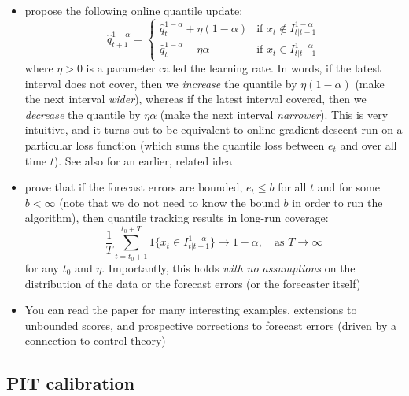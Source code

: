 \documentclass{article}
\begin{document}
\begin{itemize}
\item \citet{angelopoulos2023conformal} propose the following online quantile 
  update: 
  \[
  \hat{q}^{1-\alpha}_{t+1} =
  \begin{cases}
  \hat{q}^{1-\alpha}_t + \eta (1-\alpha) & \text{if $x_t \notin
    I^{1-\alpha}_{t|t-1}$} \\
  \hat{q}^{1-\alpha}_t - \eta \alpha & \text{if $x_t \in I^{1-\alpha}_{t|t-1}$}  
  \end{cases}
  \]
  where $\eta > 0$ is a parameter called the learning rate. In words, if the
  latest interval does not cover, then we \emph{increase} the quantile by 
  $\eta(1-\alpha)$ (make the next interval \emph{wider}), whereas if the latest 
  interval covered, then we \emph{decrease} the quantile by $\eta\alpha$ (make
  the next interval \emph{narrower}). This is very intuitive, and it turns out
  to be equivalent to online gradient descent run on a particular loss function 
  (which sums the quantile loss between $e_t$ and 
  over all time $t$). See also \citet{gibbs2021adaptive} for an earlier, related
  idea 

\item \citet{angelopoulos2023conformal} prove that if the forecast errors are
  bounded, $e_t \leq b$ for all $t$ and for some $b < \infty$ (note that we do
  not need to know the bound $b$ in order to run the algorithm), then quantile 
  tracking results in long-run coverage: 
  \[
  \frac{1}{T} \sum_{t=t_0+1}^{t_0+T} 1 \big\{ x_t \in I^{1-\alpha}_{t|t-1}
  \big\} \to 1-\alpha, \quad \text{as $T \to \infty$} 
  \]
  for any $t_0$ and $\eta$. Importantly, this holds \emph{with no assumptions}
  on the distribution of the data or the forecast errors (or the forecaster
  itself)

\item You can read the paper for many interesting examples, extensions to
  unbounded scores, and prospective corrections to forecast errors (driven by a
  connection to control theory)   
\end{itemize}

\subsection{PIT calibration}
\end{document}
